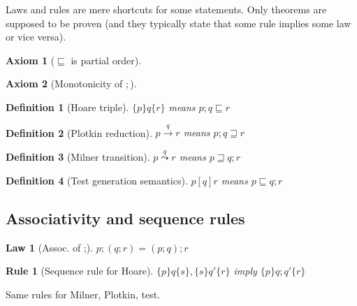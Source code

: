 \documentclass{article}
\begin{document}
\newcommand{\refines}{\sqsubseteq}
\newcommand{\refinedby}{\sqsupseteq}
\newcommand{\eps}{\varepsilon}

\newcommand{\plotkin}[1]{\stackrel{#1}{\rightarrow}}
\newcommand{\milner}[1]{\stackrel{#1}{\leadsto}}


\newtheorem{axiom}{Axiom}
\newtheorem{law}{Law}
\newtheorem{rul}{Rule}  %
\newtheorem{theorem}{Theorem}
\newtheorem{definition}{Definition}


Laws and rules are mere shortcuts for some statements.
Only theorems are supposed to be proven (and they typically state that
some rule implies some law or vice versa).


\begin{axiom} [$\refines$ is partial order]
\end{axiom}

\begin{axiom} [Monotonicity of $;$]
\end{axiom}


\begin{definition} [Hoare triple]
$\{p\}q\{r\}$ means $p;q \refines r$
\end{definition}

\begin{definition} [Plotkin reduction]
$p \plotkin{q} r$ means $p; q \refinedby r$
\end{definition}

\begin{definition} [Milner transition]
$p \milner{q} r$ means $p \refinedby q; r$
\end{definition}

\begin{definition} [Test generation semantics]
$p[q]r$ means $p \refines q;r$
\end{definition}


\subsection*{Associativity and sequence rules}

\begin{law}[Assoc. of ;]
$p;(q;r) = (p;q);r$
\end{law}

\begin{rul}[Sequence rule for Hoare]
$\{p\}q\{s\}, \{s\}q'\{r\}$ imply $\{p\}q;q'\{r\}$
\end{rul}

Same rules for Milner, Plotkin, test.
\end{document}
